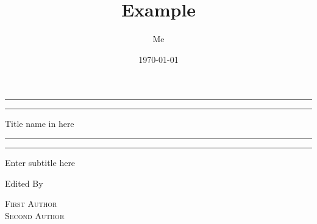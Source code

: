 \documentclass[12pt]{article}
\title{Example}
\author{Me}
\date{\today}
\begin{document}
 

\begin{titlepage} %

	\centering %
	
	\scshape %
	
	\vspace*{\baselineskip} %
	
	
	\rule{\textwidth}{1.6pt}\vspace*{-\baselineskip}\vspace*{2pt} %
	\rule{\textwidth}{0.4pt} %
	
	\vspace{0.75\baselineskip} %
	
	{\LARGE Title name in here} %
	
	\vspace{0.75\baselineskip} %
	
	\rule{\textwidth}{0.4pt}\vspace*{-\baselineskip}\vspace{3.2pt} %
	\rule{\textwidth}{1.6pt} %
	
	\vspace{2\baselineskip} %
	
	
	Enter subtitle here
	
	\vspace*{3\baselineskip} %
	
	
	Edited By
	
	\vspace{0.5\baselineskip} %
	
	{\scshape\Large First Author \\ Second Author \\} %
	
	\vspace{0.5\baselineskip} %
	

\end{titlepage}
\end{document}
